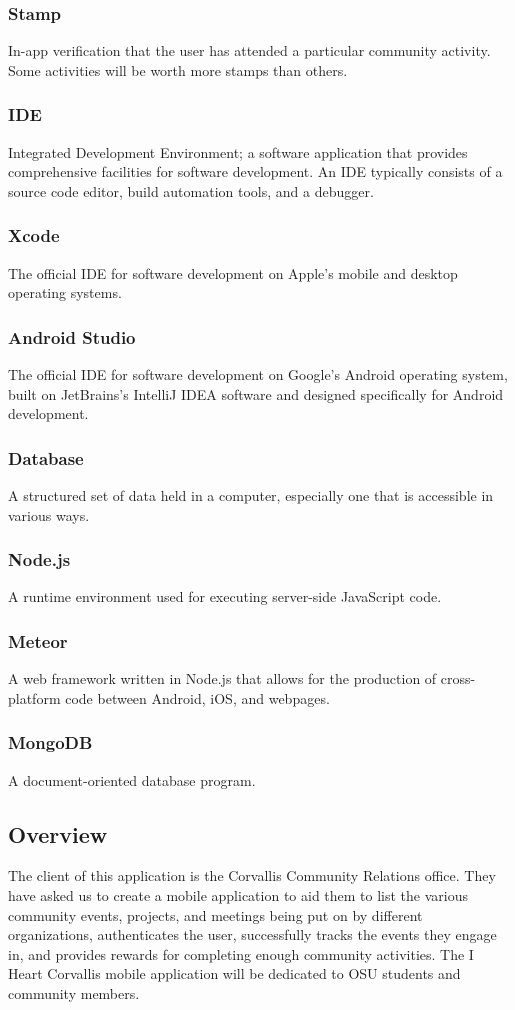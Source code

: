 \documentclass[draftclsnofoot, onecolumn, 10pt, compsoc]{IEEEtran}
\begin{document}
			\subsubsection{Stamp} In-app verification that the user has attended a particular community activity. Some activities will be worth more stamps than others.
			\subsubsection{IDE} Integrated Development Environment; a software application that provides comprehensive facilities for software development. An IDE typically consists of a source code editor, build automation tools, and a debugger.
			\subsubsection{Xcode} The official IDE for software development on Apple's mobile and desktop operating systems.
			\subsubsection{Android Studio} The official IDE for software development on Google's Android operating system, built on JetBrains's IntelliJ IDEA software and designed specifically for Android development.
			\subsubsection{Database} A structured set of data held in a computer, especially one that is accessible in various ways.
			\subsubsection{Node.js} A runtime environment used for executing server-side JavaScript code.
			\subsubsection{Meteor} A web framework written in Node.js that allows for the production of cross-platform code between Android, iOS, and webpages.
			\subsubsection{MongoDB} A document-oriented database program.
					
		\subsection{Overview}
			The client of this application is the Corvallis Community Relations office. They have asked us to create a mobile application to aid them to list the various community events, projects, and meetings being put on by different organizations, authenticates the user, successfully tracks the events they engage in, and provides rewards for completing enough community activities. The I Heart Corvallis mobile application will be dedicated to OSU students and community members.  
	
\end{document}
